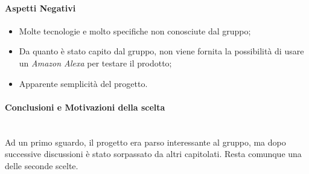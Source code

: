 \paragraph{Aspetti Negativi}
\begin{itemize}
	\item Molte tecnologie e molto specifiche non conosciute dal gruppo;
	\item Da quanto è stato capito dal gruppo, non viene fornita la possibilità di usare un \textit{Amazon Alexa} per testare il prodotto;
	\item Apparente semplicità del progetto.
\end{itemize}

\paragraph{Conclusioni e Motivazioni della scelta}\-\\
Ad un primo sguardo, il progetto era parso interessante al gruppo, ma dopo successive discussioni è stato sorpassato da altri capitolati. Resta comunque una delle seconde scelte.
